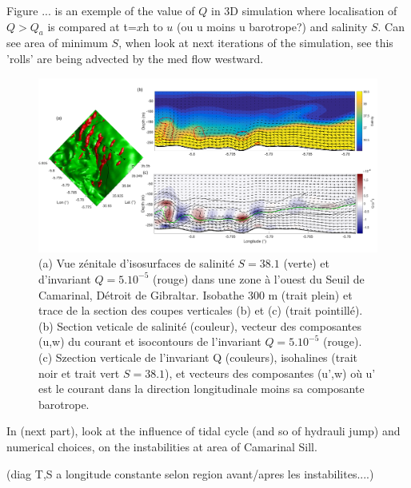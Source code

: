 Figure ... is an exemple of the value of $Q$ in 3D simulation where localisation of $Q>Q_a$ is compared at t=$x$h to $u$ (ou u moins u barotrope?) and salinity $S$. Can see area of minimum $S$, when look at next iterations of the simulation, see this 'rolls' are being advected by the med flow westward. 


\begin{figure}[!h]
 \centering
 \includegraphics[width=1\textwidth]{./GBR3D/FigInstaQ_IES4H.png}
 \caption {(a) Vue zénitale d'isosurfaces de salinité $S=38.1$ (verte) et d'invariant $Q=5.10^{-5}$ (rouge) dans une zone à l'ouest du Seuil de Camarinal, Détroit de Gibraltar. Isobathe 300 m (trait plein) et trace de la section des coupes verticales (b) et (c) (trait pointillé). (b) Section veticale de salinité (couleur), vecteur des composantes (u,w) du courant et isocontours de l'invariant $Q=5.10^{-5}$ (rouge). (c) Szection verticale de l'invariant Q (couleurs), isohalines (trait noir et trait vert $S=38.1$), et vecteurs des composantes (u',w) où u' est le courant dans la direction longitudinale moins sa composante barotrope.}
 \label{figdraftQ}
\end{figure}





In (next part), look at the influence of tidal cycle (and so of hydrauli jump) and numerical choices, on the instabilities at area of Camarinal Sill.

(diag T,S a longitude constante selon region avant/apres les instabilites....)






